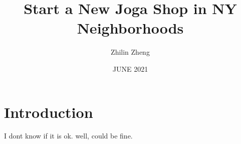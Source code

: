 \documentclass{report}
\author{Zhilin Zheng}
\title{Start a New Joga Shop in NY Neighborhoods}
\date{JUNE 2021}
\begin{document}
\maketitle
\section{Introduction}
I dont know if it is ok.
well, could be fine.
\end{document}
